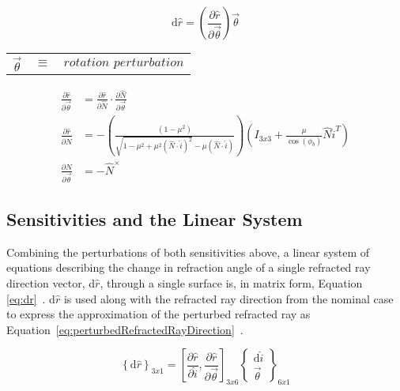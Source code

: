 \begin{table}			%
\centering
\begin{equation}		%
\label{eq:Thdr_dTh}
\textrm{d}\hat{r} = \left ( \frac{\partial\hat{r}}{\partial\vec{\theta}} \right ) \vec{\theta}
\end{equation}
\begin{tabular}{cll}
$\vec{\theta}$ & $\equiv$ & $\textit{rotation perturbation}$ \\
\end{tabular}
\end{table}

\begin{subequations}		%
\begin{align}
	\label{eq:dr_dTh}
	\frac{\partial\hat{r}}{\partial\vec{\theta}} &= \frac{\partial\hat{r}}{\partial\hat{N}} \cdot \frac{\partial\hat{N}}{\partial\vec{\theta}} \\
	\label{eq:dr_dN}
	\frac{\partial\hat{r}}{\partial\hat{N}} &= -\left(\frac{(1-\mu ^2)}{\sqrt{1-\mu ^2+\mu ^2(\hat{N}\cdot\hat{i})^2}-\mu (\hat{N}\cdot\hat{i})}\right)\left(I_{3x3}+\frac{\mu }{\cos(\phi_b)}\hat{N}\hat{i}^T\right) \\
	\label{eq:dN_dTh}
	\frac{\partial\hat{N}}{\partial\vec{\theta}} &= -\hat{N}^\times
\end{align}
\end{subequations}

\subsection{Sensitivities and the Linear System}
\label{sec:sensitivitiesLinearSystem}
Combining the perturbations of both sensitivities above, a linear system of equations describing the change in refraction angle of a single refracted ray direction vector, d$\hat{r}$, through a single surface is, in matrix form, Equation \eqref{eq:dr}~\cite{RedBreck}. d$\hat{r}$ is used along with the refracted ray direction from the nominal case to express the approximation of the perturbed refracted ray as Equation~\eqref{eq:perturbedRefractedRayDirection}~\cite{RedBreck}.

\begin{equation}		%
\label{eq:dr}
\left\{ \textrm{d}\hat{r} \right\}_{3x1} = \left[ \dfrac{\partial \hat{r}}{\partial \hat{i}}, \dfrac{\partial \hat{r}}{\partial \vec{\theta}} \right]_{3x6} \begin{Bmatrix} \textrm{d}\hat{i} \\ \vec\theta \end{Bmatrix}_{6x1}
\end{equation}

